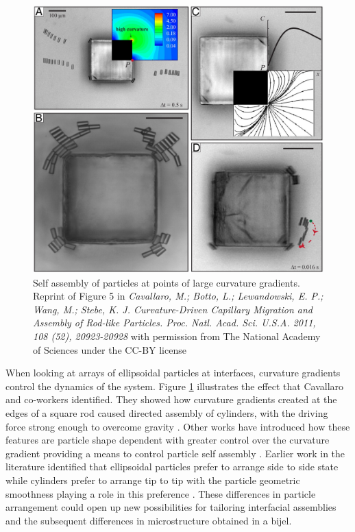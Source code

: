 \begin{figure}
    \centering
    \includegraphics[scale = 0.3]{../figures/literature_review/curvature_driven_assembly.jpeg}
    \caption{Self assembly of particles at points of large curvature gradients. Reprint of Figure 5 in 
             \textit{Cavallaro, M.; Botto, L.; Lewandowski, E. P.; Wang, M.; Stebe, K. J. Curvature-Driven Capillary Migration and Assembly of Rod-like Particles. Proc. Natl. Acad. Sci. U.S.A. 2011, 108 (52), 20923-20928} 
             with permission from The National Academy of Sciences under the CC-BY license}
    \label{fig:curvature_gradient}
\end{figure}

When looking at arrays of ellipsoidal particles at interfaces, curvature gradients control the dynamics of the system. Figure \ref{fig:curvature_gradient} illustrates the effect that
Cavallaro and co-workers identified. They showed how curvature gradients created at the edges of a 
square rod caused directed assembly of cylinders, with the driving force strong enough to overcome gravity \cite{cavallaro_curvature-driven_2011}. Other works have introduced how these features are 
particle shape dependent with greater control over the curvature gradient providing a means to control particle self assembly \cite{read_dimerization_2020, sharifi-mood_curvature_2015}.
Earlier work in the literature identified that ellipsoidal particles prefer to arrange side to side state while cylinders prefer to arrange tip to tip with the particle geometric smoothness playing 
a role in this preference \cite{botto_capillary_2012}. These differences in particle arrangement could open up new possibilities for tailoring interfacial assemblies and the subsequent differences 
in microstructure obtained in a bijel.

